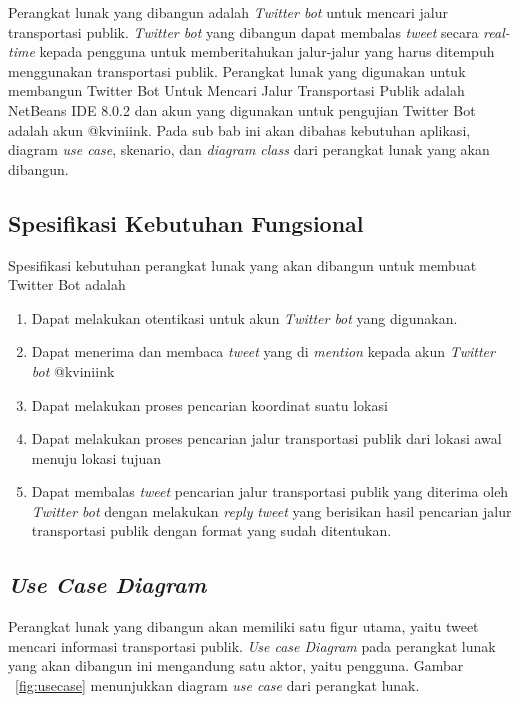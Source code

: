 Perangkat lunak yang dibangun adalah \textit{Twitter bot} untuk mencari jalur transportasi publik. \textit{Twitter bot} yang dibangun dapat membalas \textit{tweet} secara \textit{real-time} kepada pengguna untuk memberitahukan jalur-jalur yang harus ditempuh menggunakan transportasi publik. Perangkat lunak yang digunakan untuk membangun Twitter Bot Untuk Mencari Jalur Transportasi Publik adalah NetBeans IDE 8.0.2 dan akun yang digunakan untuk pengujian Twitter Bot adalah akun @kviniink. Pada sub bab ini akan dibahas kebutuhan aplikasi, diagram \textit{use case}, skenario, dan\textit{ diagram class} dari perangkat lunak yang akan dibangun.

\subsection{Spesifikasi Kebutuhan Fungsional}
Spesifikasi kebutuhan perangkat lunak yang akan dibangun untuk membuat Twitter Bot adalah
\begin{enumerate}
	\item Dapat melakukan otentikasi untuk akun \textit{Twitter bot} yang digunakan.
	\item Dapat menerima dan membaca \textit{tweet} yang di \textit{mention} kepada akun \textit{Twitter bot} @kviniink
	\item Dapat melakukan proses pencarian koordinat suatu lokasi
	\item Dapat melakukan proses pencarian jalur transportasi publik dari lokasi awal menuju lokasi tujuan
	\item Dapat membalas \textit{tweet} pencarian jalur transportasi publik yang diterima oleh \textit{Twitter bot} dengan melakukan \textit{reply} \textit{tweet} yang berisikan hasil pencarian jalur transportasi publik dengan format yang sudah ditentukan.
\end{enumerate}

\subsection{\textit{Use Case Diagram}}
Perangkat lunak yang dibangun akan memiliki satu figur utama, yaitu tweet mencari informasi transportasi publik. \textit{Use case Diagram} pada perangkat lunak yang akan dibangun ini mengandung satu aktor, yaitu pengguna. Gambar ~\ref{fig:usecase} menunjukkan diagram \textit{use case} dari perangkat lunak.

